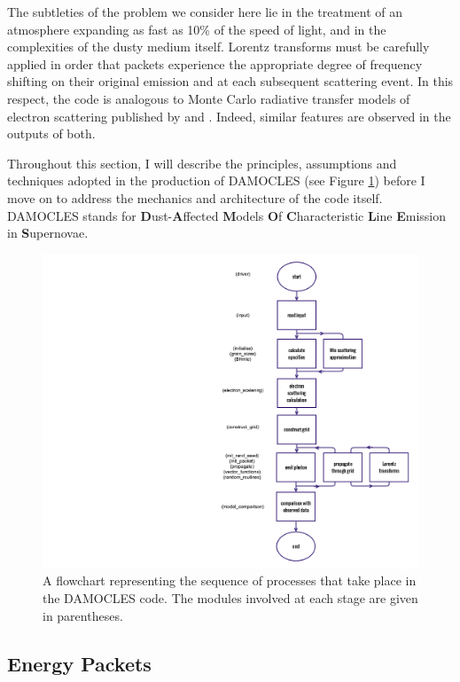 The subtleties of the problem we consider here lie in the treatment of an atmosphere expanding as fast as 10\% of the speed of light, and in the complexities of the dusty medium itself.  Lorentz transforms must be carefully applied in order that packets experience the appropriate degree of frequency shifting on their original  emission and at each subsequent scattering event.  In this respect, the code is analogous to Monte Carlo radiative transfer models of electron scattering published by \citet{Auer1972} and \citet{Hillier1991}.  Indeed, similar features are observed in the outputs of both.

Throughout this section, I will describe the principles, assumptions and techniques adopted in the production of DAMOCLES (see Figure \ref{fig:flowchart}) before I move on to address the mechanics and architecture of the code itself.  DAMOCLES stands for \textbf{D}ust-\textbf{A}ffected \textbf{M}odels \textbf{O}f \textbf{C}haracteristic \textbf{L}ine \textbf{E}mission in \textbf{S}upernovae.


\begin{figure}
\centering
\includegraphics[scale=0.185, trim=650mm 25mm 8mm 25mm]{chapters/chapter2/code_flow.png}
\caption{A flowchart representing the sequence of processes that take place in the DAMOCLES code.  The modules involved at each stage are given in parentheses.}
\label{fig:flowchart}
\end{figure}



\subsection{Energy Packets}

